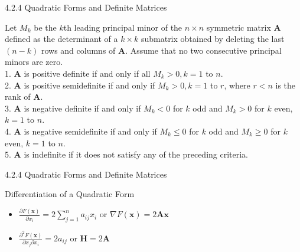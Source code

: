 \documentclass[aspectratio=169,xcolor=dvipsnames]{beamer}
\begin{document}
\begin{frame}{4.2.4 Quadratic Forms and Definite Matrices}

\begin{theorem}
    Let $M_k$ be the $k$th leading principal minor of the $n \times n$ symmetric matrix $\mathbf{A}$ defined as the determinant of a $k \times k$ submatrix obtained by deleting the last $(n - k)$ rows and columns of $\mathbf{A}$.
    Assume that no two consecutive principal minors are zero. \\
    1. $\mathbf{A}$ is positive definite if and only if all $M_k > 0, k = 1$ to $n$. \\
    2. $\mathbf{A}$ is positive semidefinite if and only if $M_k > 0, k = 1$ to $ r$, where $r < n$ is the rank of $\mathbf{A}$. \\
    3. $\mathbf{A}$ is negative definite if and only if $M_k < 0$ for $k$ odd and $M_k > 0$ for $k$ even, $k = 1$ to $n$. \\
    4. $\mathbf{A}$ is negative semidefinite if and only if $M_k \leq 0$ for $k$ odd and $M_k \geq 0$ for $k$ even, $k = 1$ to $n$. \\
    5. $\mathbf{A}$ is indefinite if it does not satisfy any of the preceding criteria.
\end{theorem}

\end{frame}

\begin{frame}{4.2.4 Quadratic Forms and Definite Matrices}

Differentiation of a Quadratic Form
\begin{itemize}
    \item $ \frac{\partial F(\mathbf{x})}{\partial x_i} = 2 \sum^n_{j = 1} a_{ij} x_i$ or $\nabla F(\mathbf{x}) = 2 \mathbf{A} \mathbf{x}$
    \item $ \frac{\partial^2 F(\mathbf{x})}{\partial x_j \partial x_i} = 2 a_{ij} $ or $ \mathbf{H} = 2 \mathbf{A} $
\end{itemize}

\end{frame}
\end{document}

